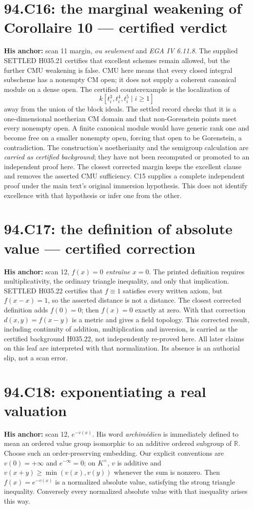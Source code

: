\documentclass[11pt]{article}
\begin{document}
\section{94.C16: the marginal weakening of Corollaire 10 --- certified verdict}
\label{C16}
\textbf{His anchor:} scan 11 margin, \emph{ou seulement} and
\emph{EGA IV 6.11.8}. The supplied SETTLED H035.21 certifies that
excellent schemes remain allowed, but the further CMU weakening
is false. CMU here means that every closed integral subscheme has
a nonempty CM open; it does not supply a coherent canonical module
on a dense open. The certified counterexample is the localization
of
\[
 k[t_i^3,t_i^4,t_i^5\mid i\ge1]
\]
away from the union of the block ideals. The settled record
checks that it is a one-dimensional noetherian CM domain and that
non-Gorenstein points meet every nonempty open. A finite canonical
module would have generic rank one and become free on a smaller
nonempty open, forcing that open to be Gorenstein, a contradiction.
The construction's noetherianity and the semigroup calculation are
\emph{carried as certified background}; they have not been recomputed
or promoted to an independent proof here. The closest corrected
margin keeps the excellent clause and removes the asserted CMU
sufficiency. C15 supplies a complete independent proof under the
main text's original immersion hypothesis. This does not identify
excellence with that hypothesis or infer one from the other.

\section{94.C17: the definition of absolute value --- certified correction}
\label{C17}
\textbf{His anchor:} scan 12, \emph{$f(x)=0$ entra\^ine $x=0$}.
The printed definition requires multiplicativity, the ordinary triangle
inequality, and only that implication. SETTLED H035.22 certifies that
$f\equiv1$ satisfies every written axiom, but $f(x-x)=1$, so the
asserted distance is not a distance. The closest corrected definition
adds $f(0)=0$; then $f(x)=0$ exactly at zero. With that correction
$d(x,y)=f(x-y)$ is a metric and gives a field topology. This corrected
result, including continuity of addition, multiplication and inversion,
is carried as the certified background H035.22, not independently
re-proved here. All later claims on this leaf are interpreted with that
normalization. Its absence is an authorial slip, not a scan error.

\section{94.C18: exponentiating a real valuation}
\label{C18}
\textbf{His anchor:} scan 12, \emph{$e^{-v(x)}$}.
His word \emph{archim\'edien} is immediately defined to mean an ordered
value group isomorphic to an additive ordered subgroup of $\mathbb R$.
Choose such an order-preserving embedding. Our explicit conventions
are $v(0)=+\infty$ and $e^{-\infty}=0$; on $K^\times$, $v$ is
additive and $v(x+y)\ge\min(v(x),v(y))$ whenever the sum is nonzero.
Then $f(x)=e^{-v(x)}$ is a normalized absolute value, satisfying the
strong triangle inequality. Conversely every normalized absolute
value with that inequality arises this way.
\end{document}
